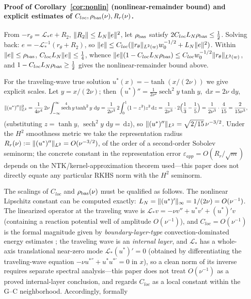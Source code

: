 \documentclass[11pt]{article}
\DeclarePairedDelimiter{\norm}{\lVert}{\rVert}
\newcommand{\Lop}{\mathcal L}
\newcommand{\dd}{\,\mathrm d}
\DeclareMathOperator{\sech}{sech}
\numberwithin{equation}{section}
\begin{document}
\paragraph{Proof of Corollary~\ref{cor:nonlin} (nonlinear-remainder bound) and explicit estimates of $C_{loc},\rho_{\rm bas}(\nu),R_r(\nu)$.}
From $-r_\theta=\Lop_*e+R_2$, $\norm{R_2}\le L_N\norm e^2$, let $\rho_{\rm bas}$ satisfy $2C_{loc}L_N\rho_{\rm bas}\le\tfrac12$. Solving back: $e=-\Lop_*^{-1}(r_\theta+R_2)$, so $\norm e\le C_{loc}(\norm{r_\theta}_{L^2(w)}w_0^{-1/2}+L_N\norm e^2)$. Within $\norm e\le\rho_{\rm bas}$, $C_{loc}L_N\norm e\le\tfrac14$, whence $\norm e(1-C_{loc}L_N\rho_{\rm bas})\le C_{loc}w_0^{-1/2}\norm{r_\theta}_{L^2(w)}$, and $1-C_{loc}L_N\rho_{\rm bas}\ge\tfrac12$ gives the nonlinear-remainder bound above.
\par
For the traveling-wave true solution $u^*(x)=-\tanh(x/(2\nu))$ we give explicit scales. Let $y=x/(2\nu)$; then $(u^*)''=\tfrac{1}{2\nu^2}\sech^{2}y\tanh y$, $\dd x=2\nu\,\dd y$,
\begin{equation}\label{eq:rr}
\norm{(u^*)''}_{L^2}^2=\frac{1}{4\nu^4}\,2\nu\!\int_{-\infty}^{\infty}\sech^{4}y\tanh^2y\,\dd y
=\frac{1}{2\nu^3}\,2\!\int_0^1(1-z^2)z^2\dd z
=\frac{1}{2\nu^3}\cdot 2\Big(\frac13-\frac15\Big)
=\frac{1}{2\nu^3}\cdot\frac{4}{15}
=\frac{2}{15\nu^3},
\end{equation}
(substituting $z=\tanh y$, $\sech^{2}y\,\dd y=\dd z$), so $\norm{(u^*)''}_{L^2}=\sqrt{2/15}\,\nu^{-3/2}$. Under the $H^2$ smoothness metric we take the representation radius $R_r(\nu):=\norm{(u^*)''}_{L^2}=O(\nu^{-3/2})$, of the order of a second-order Sobolev seminorm; the concrete constant in the representation error $\varepsilon_{app}=O(R_r/\sqrt m)$ depends on the NTK/kernel-approximation theorem used---this paper does not directly equate any particular RKHS norm with the $H^2$ seminorm.
\par
The scalings of $C_{loc}$ and $\rho_{\rm bas}(\nu)$ must be qualified as follows. The nonlinear Lipschitz constant can be computed exactly: $L_N=\norm{(u^*)'}_\infty=1/(2\nu)=O(\nu^{-1})$. The linearized operator at the traveling wave is $\Lop_*v=-\nu v''+u^*v'+(u^*)'v$ (containing a reaction potential well of amplitude $O(\nu^{-1})$), and $C_{loc}=O(\nu^{-1})$ is the formal magnitude given by \emph{boundary-layer-type} convection-dominated energy estimates \cite{RoosStynesTobiska1996}; the traveling wave is an \emph{internal layer}, and $\Lop_*$ has a whole-axis translational near-zero mode $\Lop_*(u^*)'=0$ (obtained by differentiating the traveling-wave equation $-\nu u^{*''}+u^*u^{*'}=0$ in $x$), so a clean norm of its inverse requires separate spectral analysis---this paper does not treat $O(\nu^{-1})$ as a proved internal-layer conclusion, and regards $C_{loc}$ as a local constant within the G--C neighborhood. Accordingly, formally
\end{document}
